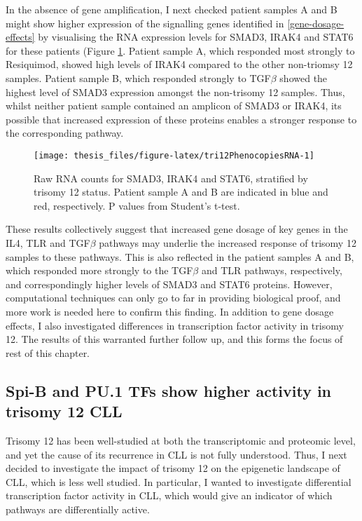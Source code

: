 \documentclass[11pt, a4paper, twosided]{book}
\begin{document}
In the absence of gene amplification, I next checked patient samples A and B might show higher expression of the signalling genes identified in \ref{gene-dosage-effects} by visualising the RNA expression levels for SMAD3, IRAK4 and STAT6 for these patients (Figure \ref{fig:tri12PhenocopiesRNA}. Patient sample A, which responded most strongly to Resiquimod, showed high levels of IRAK4 compared to the other non-triomsy 12 samples. Patient sample B, which responded strongly to TGF\(\beta\) showed the highest level of SMAD3 expression amongst the non-trisomy 12 samples. Thus, whilst neither patient sample contained an amplicon of SMAD3 or IRAK4, its possible that increased expression of these proteins enables a stronger response to the corresponding pathway.


\begin{figure}

{\centering \texttt{[image: thesis\_files/figure-latex/tri12PhenocopiesRNA-1]} 

}

\caption{Raw RNA counts for SMAD3, IRAK4 and STAT6, stratified by trisomy 12 status. Patient sample A and B are indicated in blue and red, respectively. P values from Student's t-test.}\label{fig:tri12PhenocopiesRNA}
\end{figure}
These results collectively suggest that increased gene dosage of key genes in the IL4, TLR and TGF\(\beta\) pathways may underlie the increased response of trisomy 12 samples to these pathways. This is also reflected in the patient samples A and B, which responded more strongly to the TGF\(\beta\) and TLR pathways, respectively, and correspondingly higher levels of SMAD3 and STAT6 proteins. However, computational techniques can only go to far in providing biological proof, and more work is needed here to confirm this finding. In addition to gene dosage effects, I also investigated differences in transcription factor activity in trisomy 12. The results of this warranted further follow up, and this forms the focus of rest of this chapter.

\hypertarget{spi-b-and-pu.1-tfs-show-higher-activity-in-trisomy-12-cll}{%
\subsection{Spi-B and PU.1 TFs show higher activity in trisomy 12 CLL}\label{spi-b-and-pu.1-tfs-show-higher-activity-in-trisomy-12-cll}}

Trisomy 12 has been well-studied at both the transcriptomic and proteomic level, and yet the cause of its recurrence in CLL is not fully understood. Thus, I next decided to investigate the impact of trisomy 12 on the epigenetic landscape of CLL, which is less well studied. In particular, I wanted to investigate differential transcription factor activity in CLL, which would give an indicator of which pathways are differentially active.
\end{document}
